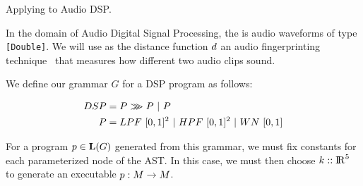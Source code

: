 \begin{exmp}
Applying \approximatePBE to Audio DSP.

In the domain of Audio Digital Signal Processing, the \exampleDomain is audio waveforms of type \texttt{[Double]}.
We will use as the distance function ${d}$ an audio fingerprinting technique~\cite{SantolucitoFARM} that measures how different two audio clips sound.

We define our grammar $G$ for a DSP program as follows:

\begin{align*}
DSP &= P >\mkern-9mu>\mkern-9mu> P\ |\ P \\
P   & = LPF \ [0,1]^2 \ |\ HPF \ [0,1]^2 \ |\ WN \ [0,1]
\end{align*}

For a program $p \in \mathbf{L}(G)$ generated from this grammar, we must fix constants for each parameterized node of the AST.
In this case, we must then choose ${k} :: {\rm I\!R}^{5}$ to generate an executable $p:M \to M$. 

\end{exmp}
